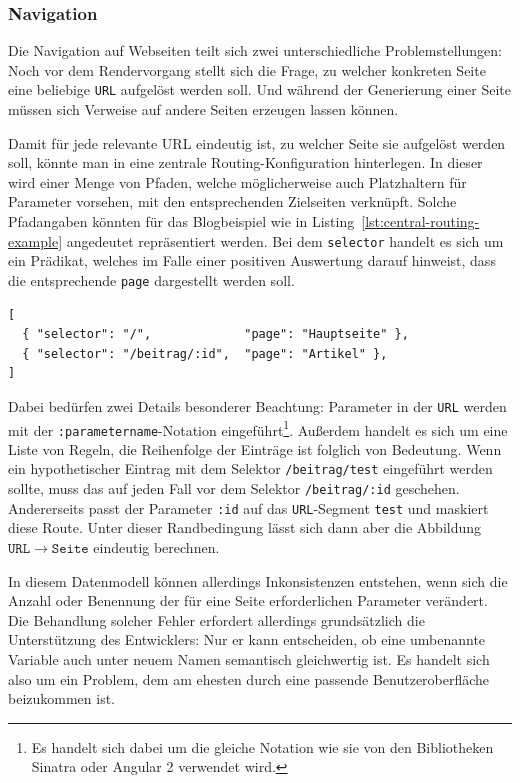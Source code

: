 \subsubsection{Navigation}

Die Navigation auf Webseiten teilt sich zwei unterschiedliche Problemstellungen: Noch vor dem Rendervorgang stellt sich die Frage, zu welcher konkreten Seite eine beliebige \texttt{URL} aufgelöst werden soll. Und während der Generierung einer Seite müssen sich Verweise auf andere Seiten erzeugen lassen können.

Damit für jede relevante URL eindeutig ist, zu welcher Seite sie aufgelöst werden soll, könnte man in \idename{} eine zentrale Routing-Konfiguration hinterlegen. In dieser wird einer Menge von Pfaden, welche möglicherweise auch Platzhaltern für Parameter vorsehen, mit den entsprechenden Zielseiten verknüpft. Solche Pfadangaben könnten für das Blogbeispiel wie in Listing~\ref{lst:central-routing-example} angedeutet repräsentiert werden. Bei dem \texttt{selector} handelt es sich um ein Prädikat, welches im Falle einer positiven Auswertung darauf hinweist, dass die entsprechende \texttt{page} dargestellt werden soll.

\begin{lstlisting}[float=h!,caption={Zentrales Routing für das Blog-Beispiel}, label={lst:central-routing-example}]
[
  { "selector": "/",             "page": "Hauptseite" },
  { "selector": "/beitrag/:id",  "page": "Artikel" },
]
\end{lstlisting}

Dabei bedürfen zwei Details besonderer Beachtung: Parameter in der \texttt{URL} werden mit der  \texttt{:parametername}-Notation eingeführt\footnote{Es handelt sich dabei um die gleiche Notation wie sie von den Bibliotheken Sinatra oder Angular 2 verwendet wird.}. Außerdem handelt es sich um eine Liste von Regeln, die Reihenfolge der Einträge ist folglich von Bedeutung. Wenn ein hypothetischer Eintrag mit dem Selektor \texttt{/beitrag/test} eingeführt werden sollte, muss das auf jeden Fall vor dem Selektor \texttt{/beitrag/:id} geschehen. Andererseits passt der Parameter \texttt{:id} auf das \texttt{URL}-Segment \texttt{test} und maskiert diese Route. Unter dieser Randbedingung lässt sich dann aber die Abbildung $\mathtt{URL} \rightarrow \mathtt{Seite}$ eindeutig berechnen.

In diesem Datenmodell können allerdings Inkonsistenzen entstehen, wenn sich die Anzahl oder Benennung der für eine Seite erforderlichen Parameter verändert. Die Behandlung solcher Fehler erfordert allerdings grundsätzlich die Unterstützung des Entwicklers: Nur er kann entscheiden, ob eine umbenannte Variable auch unter neuem Namen semantisch gleichwertig ist. Es handelt sich also um ein Problem, dem am ehesten durch eine passende Benutzeroberfläche beizukommen ist.

